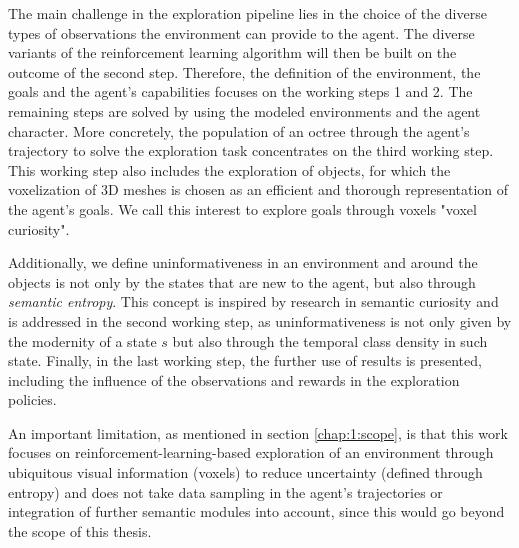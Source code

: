 The main challenge in the exploration pipeline lies in the choice of the diverse types of observations the environment can provide to the agent. The diverse variants of the reinforcement learning algorithm will then be built on the outcome of the second step.
Therefore, the definition of the environment, the goals and the agent's capabilities focuses on the working steps 1 and 2. The remaining steps are solved by using the modeled environments and the agent character. 
More concretely, the population of an octree through the agent's trajectory to solve the exploration task concentrates on the third working step. This working step also includes the exploration of objects, for which the voxelization of 3D meshes is chosen as an efficient and thorough representation of the agent's goals. We call this interest to explore goals through voxels "voxel curiosity".

Additionally, we define uninformativeness in an environment and around the objects is not only by the states that are new to the agent, but also through \textit{semantic entropy}. This concept is inspired by research in semantic curiosity \cite{chaplot2020semantic} and is addressed in the second working step, as uninformativeness is not only given by the modernity of a state $s$ but also through the temporal class density in such state.
Finally, in the last working step, the further use of results is presented, including the influence of the observations and rewards in the exploration policies.

An important limitation, as mentioned in section \ref{chap:1:scope}, is that this work focuses on reinforcement-learning-based exploration of an environment through ubiquitous visual information (voxels) to reduce uncertainty (defined through entropy) and does not take data sampling in the agent's trajectories or integration of further semantic modules into account, since this would go beyond the scope of this thesis.

